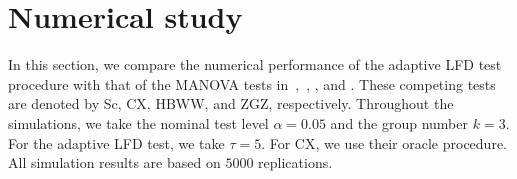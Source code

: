 \documentclass[12pt]{article} %
\DeclareMathOperator{\mytr}{tr}
\DeclareMathOperator{\myE}{E}
\newcommand{\bX}{\mathbf{X}}
\newcommand{\bfsym}[1]{\ensuremath{\boldsymbol{#1}}}
\def\bSigma {\bfsym {\Sigma}}
\def\bTheta {\bfsym {\Theta}}
\theoremstyle{definition}
\begin{document}
%






\section{Numerical study}\label{numerical}
\setcounter{equation}{0} %

In this section, we compare the numerical performance of the adaptive LFD test procedure with that of the MANOVA tests in~\citet{Schott2007Some},~\citet{Cai2014High}, \cite{Hu2017}, and \cite{ZHANG2017200}.
These competing tests are denoted by Sc, CX, HBWW, and ZGZ, respectively.
Throughout the simulations, we take the nominal test level $\alpha =0.05$ and the group number $k=3$.
For the adaptive LFD test, we take $\tau=5$.
For CX, we use their oracle procedure.
All simulation results are based on $5000$ replications.
\end{document}
